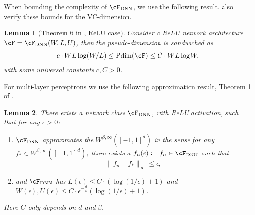 \documentclass[11pt]{article}
\newtheorem{lemma}{Lemma}
\numberwithin{equation}{section}
\theoremstyle{definition}
\newcommand{\deq}{:=}
\begin{document}
\begin{appendices}
When bounding the complexity of $\cF_{\rm DNN}$, we use the following result. \cite{Bartlett-etal2017_COLT} also verify these bounds for the VC-dimension.
\begin{lemma}[Theorem 6 in \cite{Bartlett-etal2017_COLT}, ReLU case]
	\label{lem:VC}
	Consider a ReLU network architecture $\cF = \cF_{\rm DNN}(W, L, U)$, then the pseudo-dimension is sandwiched as
	\[
		c \cdot WL \log (W/L) \leq {\rm Pdim}(\cF) \leq C \cdot WL \log W,
	\]
	with some universal constants $c, C>0$. 
\end{lemma}



For multi-layer perceptrons we use the following approximation result, Theorem 1 of \cite{Yarotsky2017_NN}.
\begin{lemma}%
	\label{lem:approx-net}
	There exists a network class $\cF_{\rm DNN}$, with ReLU activation, such that for any $\epsilon>0$:
	\begin{enumerate}
		\item $\cF_{\rm DNN}$ approximates the $W^{\beta, \infty}([-1,1]^d)$ in the sense for any $f_* \in W^{\beta, \infty}([-1,1]^d)$, there exists a $f_n(\epsilon) \deq f_n \in \cF_{\rm DNN}$ such that
		\[
			\| f_n - f_* \|_\infty \leq \epsilon,
		\]
		\item and $\cF_{\rm DNN}$ has $L(\epsilon) \leq C \cdot ( \log (1/\epsilon) + 1)$ and $W(\epsilon), U(\epsilon) \leq C \cdot \epsilon^{-\frac{d}{\beta}} ( \log (1/\epsilon) + 1)$.
	\end{enumerate}
	Here $C$ only depends on $d$ and $\beta$.
\end{lemma}















\end{appendices}
\end{document}
